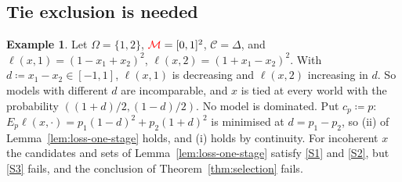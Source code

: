 \documentclass[11pt]{article}
\newcommand{\chg}[1]{{\color{red}#1}}
\theoremstyle{definition}
\newtheorem{example}[theorem]{Example}
\theoremstyle{remark}
\newcommand{\M}{\mathcal M}
\newcommand{\C}{\mathcal C}
\begin{document}
\subsection{Tie exclusion is needed}

\begin{example}\label{ex:ties}
Let $\Omega=\{1,2\}$, $\chg{\M}=[0,1]^2$, $\C=\Delta$, and $\ell(x,1)=(1-x_1+x_2)^2$, $\ell(x,2)=(1+x_1-x_2)^2$. With $d\coloneqq x_1-x_2\in[-1,1]$, $\ell(x,1)$ is decreasing and $\ell(x,2)$ increasing in $d$. So models with different $d$ are incomparable, and $x$ is tied at every world with the probability $((1+d)/2,(1-d)/2)$. No model is dominated. Put $c_p\coloneqq p$: $E_p\ell(x,\cdot)=p_1(1-d)^2+p_2(1+d)^2$ is minimised at $d=p_1-p_2$, so (ii) of Lemma~\ref{lem:loss-one-stage} holds, and (i) holds by continuity. For incoherent $x$ the candidates and sets of Lemma~\ref{lem:loss-one-stage} satisfy \ref{S1} and \ref{S2}, but \ref{S3} fails, and the conclusion of Theorem~\ref{thm:selection} fails.
\end{example}



\end{document}
